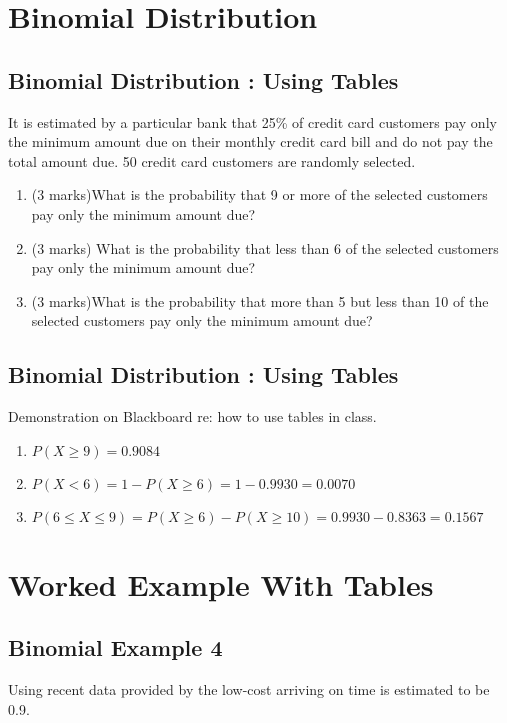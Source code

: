 \documentclass[]{report}
\begin{document}

\section{Binomial Distribution}

{
\subsection{Binomial Distribution : Using Tables}
It is estimated by a particular bank that 25\% of credit card customers pay only the minimum amount due on their monthly credit card bill and do not pay the total amount due. 50 credit card customers are randomly selected.
\begin{enumerate}
\item (3 marks)What is the probability that 9 or more of the selected customers pay only the minimum amount due?
\item (3 marks) What is the probability that less than 6 of the selected customers pay only the minimum amount due?
\item (3 marks)What is the probability that more than 5 but less than 10 of the selected customers pay only the minimum amount due?
\end{enumerate}

}

{
\subsection{Binomial Distribution : Using Tables}
Demonstration on Blackboard re: how to use tables in class.
\begin{enumerate}
\item $P(X \geq 9) = 0.9084$
\item $P(X < 6) = 1- P(X \geq 6) =1 - 0.9930 = 0.0070$
\item $P(6 \leq X \leq 9) = P(X \geq 6) - P(X \geq 10) = 0.9930 - 0.8363 = 0.1567$
\end{enumerate}

}

\section{Worked Example With Tables}



\subsection{Binomial Example 4 }Using recent data provided by the low-cost
arriving on time is estimated to be 0.9.
\end{document}
